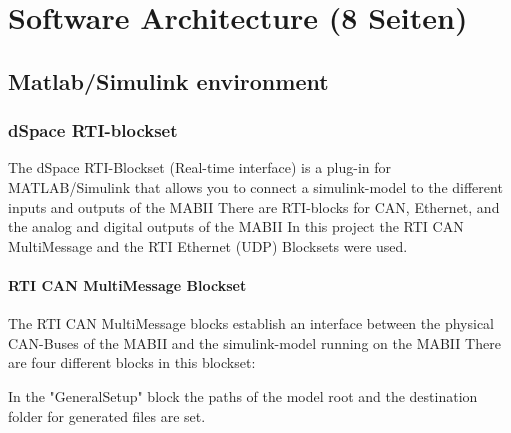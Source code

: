 \documentclass[ExampleMasters.tex]{subfiles}
\begin{document}
\clearpage
{\pagestyle{empty}\cleardoublepage}%


\chapter{Software Architecture (8 Seiten)}
\label{chap:software_setup}


\section{Matlab/Simulink environment}
\label{sec:matlab}




\subsection{dSpace RTI-blockset}
\label{dSpace_RTI}
The dSpace RTI-Blockset (Real-time interface) is a plug-in for MATLAB/Simulink that allows you to connect a simulink-model to the different inputs and outputs of the \gls{MABII} There are \gls{RTI}-blocks for CAN, Ethernet, and the analog and digital outputs of the \gls{MABII}
In this project the \gls{RTI} \gls{CAN} MultiMessage and the \gls{RTI} Ethernet (UDP) Blocksets were used.\\ 
\subsubsection{RTI \gls{CAN} MultiMessage Blockset}
The \gls{RTI} \gls{CAN} MultiMessage blocks establish an interface between the physical \gls{CAN}-Buses of the \gls{MABII} and the simulink-model running on the \gls{MABII} There are four different blocks in this blockset: 

In the "GeneralSetup" block the paths of the model root and the destination folder for generated files are set. 
\end{document}
